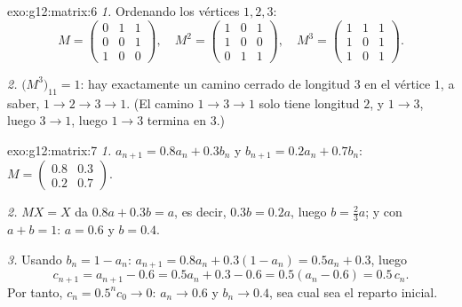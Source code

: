 \begin{solution}{exo:g12:matrix:6}
\emph{1.} Ordenando los vértices $1, 2, 3$:
\[
M = \begin{pmatrix} 0&1&1\\ 0&0&1\\ 1&0&0\end{pmatrix}, \quad
M^2 = \begin{pmatrix} 1&0&1\\ 1&0&0\\ 0&1&1\end{pmatrix}, \quad
M^3 = \begin{pmatrix} 1&1&1\\ 1&0&1\\ 1&0&1 \end{pmatrix}.
\]

\emph{2.} $\bigl(M^3\bigr)_{11} = 1$: hay exactamente un camino cerrado de
longitud $3$ en el vértice $1$, a saber, $1 \to 2 \to 3 \to 1$. (El camino
$1 \to 3 \to 1$ solo tiene longitud $2$, y $1 \to 3$, luego $3\to1$, luego
$1\to3$ termina en $3$.)
\end{solution}

\begin{solution}{exo:g12:matrix:7}
\emph{1.} $a_{n+1} = 0.8a_n + 0.3b_n$ y $b_{n+1} = 0.2a_n + 0.7b_n$:
$M = \begin{pmatrix} 0.8 & 0.3\\ 0.2 & 0.7\end{pmatrix}$.

\emph{2.} $MX = X$ da $0.8a + 0.3b = a$, es decir, $0.3b = 0.2a$, luego
$b = \frac23 a$; y con $a + b = 1$: $a = 0.6$ y $b = 0.4$.

\emph{3.} Usando $b_n = 1 - a_n$:
$a_{n+1} = 0.8a_n + 0.3(1 - a_n) = 0.5a_n + 0.3$, luego
\[
c_{n+1} = a_{n+1} - 0.6 = 0.5a_n + 0.3 - 0.6 = 0.5(a_n - 0.6) = 0.5\,c_n .
\]
Por tanto, $c_n = 0.5^n c_0 \to 0$: $a_n \to 0.6$ y $b_n \to 0.4$, sea cual
sea el reparto inicial.
\end{solution}

